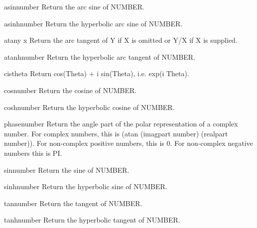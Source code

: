 \begin{function}{asin}{number}{}{}
  Return the arc sine of NUMBER.
\end{function}

\begin{function}{asinh}{number}{}{}
  Return the hyperbolic arc sine of NUMBER.
\end{function}

\begin{function}{atan}{y \op x}{}{}
  Return the arc tangent of Y if X is omitted or Y/X if X is supplied.
\end{function}

\begin{function}{atanh}{number}{}{}
  Return the hyperbolic arc tangent of NUMBER.
\end{function}

\begin{function}{cis}{theta}{}{}
  Return cos(Theta) + i sin(Theta), i.e. exp(i Theta).
\end{function}

\begin{function}{cos}{number}{}{}
  Return the cosine of NUMBER.
\end{function}

\begin{function}{cosh}{number}{}{}
  Return the hyperbolic cosine of NUMBER.
\end{function}

\begin{function}{phase}{number}{}{}
  Return the angle part of the polar representation of a complex number.
  For complex numbers, this is (atan (imagpart number) (realpart number)).
  For non-complex positive numbers, this is 0. For non-complex negative
  numbers this is PI.
\end{function}

\begin{function}{sin}{number}{}{}
  Return the sine of NUMBER.
\end{function}

\begin{function}{sinh}{number}{}{}
  Return the hyperbolic sine of NUMBER.
\end{function}

\begin{function}{tan}{number}{}{}
  Return the tangent of NUMBER.
\end{function}

\begin{function}{tanh}{number}{}{}
  Return the hyperbolic tangent of NUMBER.
\end{function}

